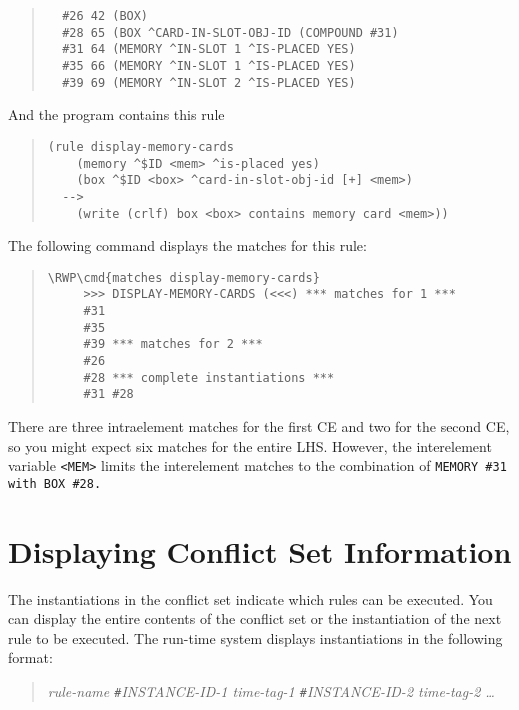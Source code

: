\begin{quote}
\begin{verbatim}
  #26 42 (BOX)
  #28 65 (BOX ^CARD-IN-SLOT-OBJ-ID (COMPOUND #31)
  #31 64 (MEMORY ^IN-SLOT 1 ^IS-PLACED YES)
  #35 66 (MEMORY ^IN-SLOT 1 ^IS-PLACED YES)
  #39 69 (MEMORY ^IN-SLOT 2 ^IS-PLACED YES)
\end{verbatim}
\end{quote}

And the program contains this rule

\begin{quote}
\begin{verbatim}
(rule display-memory-cards
    (memory ^$ID <mem> ^is-placed yes)
    (box ^$ID <box> ^card-in-slot-obj-id [+] <mem>)
  -->
    (write (crlf) box <box> contains memory card <mem>))
\end{verbatim}
\end{quote}

The following command displays the matches for this rule:

\begin{quote}
\begin{Verbatim}[commandchars=\\\{\}]
\RWP\cmd{matches display-memory-cards}
     >>> DISPLAY-MEMORY-CARDS (<<<) *** matches for 1 ***
     #31
     #35
     #39 *** matches for 2 ***
     #26
     #28 *** complete instantiations ***
     #31 #28
\end{Verbatim}
\end{quote}

There are three intraelement matches for the first CE and two for the
second CE, so you might expect six matches for the entire
LHS. However, the interelement variable \verb|<MEM>| limits the
interelement matches to the combination of \tt{MEMORY} \verb|#31| with
\tt{BOX} \verb|#28|.

\section{Displaying Conflict Set Information}

The instantiations in the conflict set indicate which rules can be
executed. You can display the entire contents of the conflict set or
the instantiation of the next rule to be executed. The run-time system
displays instantiations in the following format:

\begin{quote}
  \it{rule-name} \verb|#|\it{INSTANCE-ID-1} \it{time-tag-1}
  \verb|#|\it{INSTANCE-ID-2} \it{time-tag-2} \ldots
\end{quote}

